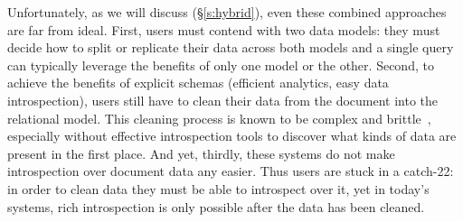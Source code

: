Unfortunately, as we will discuss (\S\ref{s:hybrid}), even these combined approaches are far from ideal. First, users must contend with two data models: they must decide how to split or replicate their data across both models and a single query can typically leverage the benefits of only one model or the other. Second, to achieve the benefits of explicit schemas (efficient analytics, easy data introspection), users still have to clean their data from the document into the relational model. This cleaning process is known to be complex and brittle~\cite{civilizer, databricks_json_data_ingest}, especially without effective introspection tools to discover what kinds of data are present in the first place. And yet, thirdly, these systems do not make introspection over document data any easier. Thus users are stuck in a catch-22: in order to clean data they must be able to introspect over it, yet in today's systems, rich introspection is only possible after the data has been cleaned.



